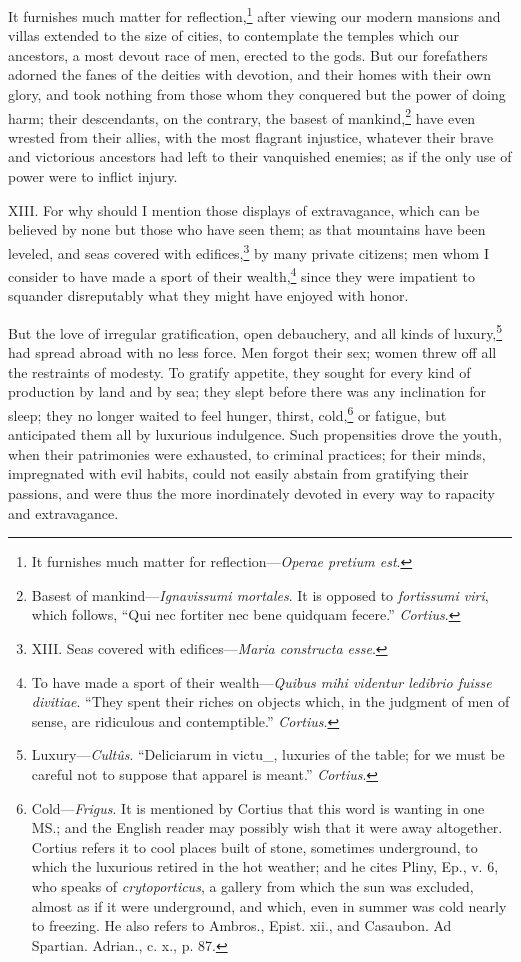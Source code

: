 It furnishes much matter for reflection,\footnote{It furnishes much matter for reflection—\emph{Operae pretium est}.} after viewing our modern
mansions and villas extended to the size of cities, to contemplate the
temples which our ancestors, a most devout race of men, erected to the
gods. But our forefathers adorned the fanes of the deities with devotion,
and their homes with their own glory, and took nothing from those whom
they conquered but the power of doing harm; their descendants, on the
contrary, the basest of mankind,\footnote{Basest of mankind—\emph{Ignavissumi mortales}. It is opposed to
\emph{fortissumi viri}, which follows, ``Qui nec fortiter nec bene quidquam
fecere.'' \emph{Cortius}.} have even wrested from their allies,
with the most flagrant injustice, whatever their brave and victorious
ancestors had left to their vanquished enemies; as if the only use of
power were to inflict injury.

XIII. For why should I mention those displays of extravagance, which
can be believed by none but those who have seen them; as that mountains
have been leveled, and seas covered with edifices,\footnote{XIII. Seas covered with edifices—\emph{Maria constructa esse}.} by many private
citizens; men whom I consider to have made a sport of their wealth,\footnote{To have made a sport of their wealth—\emph{Quibus mihi videntur
ledibrio fuisse divitiae}. ``They spent their riches on objects which,
in the judgment of men of sense, are ridiculous and contemptible.''
\emph{Cortius}.}
since they were impatient to squander disreputably what they might have
enjoyed with honor.

But the love of irregular gratification, open debauchery, and all
kinds of luxury,\footnote{Luxury—\emph{Cultûs}. ``Deliciarum in victu\_, luxuries of the table;
for we must be careful not to suppose that apparel is meant.''
\emph{Cortius}.} had spread abroad with no less force. Men forgot
their sex; women threw off all the restraints of modesty. To gratify
appetite, they sought for every kind of production by land and by sea;
they slept before there was any inclination for sleep; they no longer
waited to feel hunger, thirst, cold,\footnote{Cold—\emph{Frigus}. It is mentioned by Cortius that this word is
wanting in one MS.; and the English reader may possibly wish that it
were away altogether. Cortius refers it to cool places built of stone,
sometimes underground, to which the luxurious retired in the hot
weather; and he cites Pliny, Ep., v. 6, who speaks of \emph{crytoporticus},
a gallery from which the sun was excluded, almost as if it were
underground, and which, even in summer was cold nearly to freezing.
He also refers to Ambros., Epist. xii., and Casaubon. Ad Spartian.
Adrian., c. x., p. 87.} or fatigue, but anticipated
them all by luxurious indulgence. Such propensities drove the youth,
when their patrimonies were exhausted, to criminal practices; for
their minds, impregnated with evil habits, could not easily abstain
from gratifying their passions, and were thus the more inordinately
devoted in every way to rapacity and extravagance.

